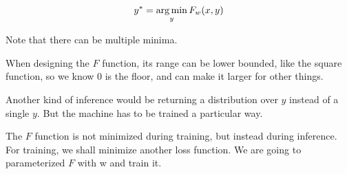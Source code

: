 \begin{equation*}
    y^* = \argmin_y F_w (x,y)
\end{equation*}

Note that there can be multiple minima.

When designing the $F$ function, its range can be lower bounded, like the square function, so we know 0 is the floor, and can make it larger for other things. 

Another kind of inference would be returning a distribution over $y$ instead of a single $y$. But the machine has to be trained a particular way.

The $F$ function is not minimized during training, but instead during inference. 
For training, we shall minimize another loss function. We are going to parameterized $F$ with w and train it.


